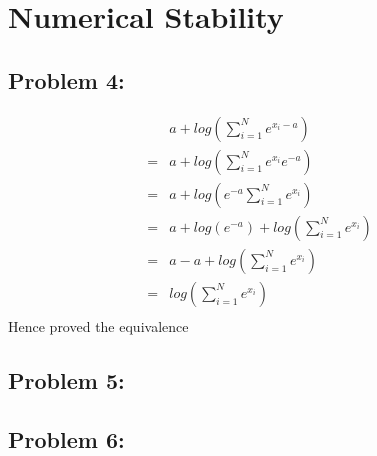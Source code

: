 \documentclass[5pt,a4paper]{article}
\begin{document}
	\section{ Numerical Stability}
	\subsection*{Problem 4:}
	\begin{eqnarray*}
	&a+log(\sum_{i=1}^{N}e^{x_i-a})\\
	=&a+log(\sum_{i=1}^{N}e^{x_i}e^{-a})\\
	=&a+log(e^{-a}\sum_{i=1}^{N}e^{x_i})\\
	=&a+log(e^{-a})+log(\sum_{i=1}^{N}e^{x_i})\\
	=&a-a+log(\sum_{i=1}^{N}e^{x_i})\\
	=&log(\sum_{i=1}^{N}e^{x_i})\\
	\end{eqnarray*}
	Hence proved the equivalence
	
	\subsection*{Problem 5:}
	
	\subsection*{Problem 6:}
	
	
\end{document}
